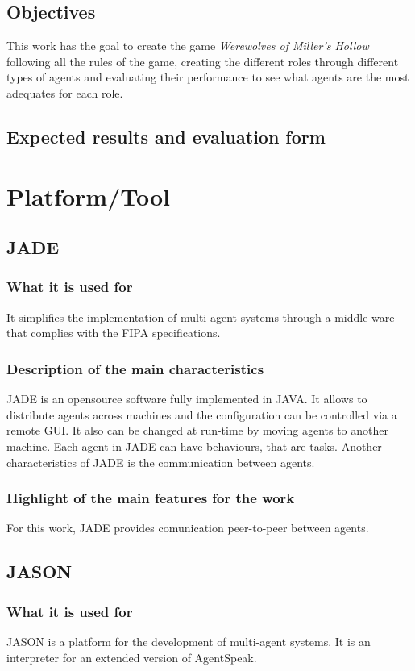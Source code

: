 \documentclass{article}
\begin{document}
\subsection{Objectives}
This work has the goal to create the game \textit{Werewolves of Miller’s Hollow} following all the rules of the game, creating the different roles through different types of agents and evaluating their performance to see what agents are the most adequates for each role. 
\subsection{Expected results and evaluation form}

\section{Platform/Tool}
\subsection{JADE}
\subsubsection{What it is used for}
It simplifies the implementation of multi-agent systems through a middle-ware that complies with the FIPA specifications.
\subsubsection{Description of the main characteristics}
JADE is an opensource software fully implemented in JAVA. It allows to distribute agents across machines and the configuration can be controlled via a remote GUI. It also can be changed at run-time by moving agents to another machine. Each agent in JADE can have behaviours, that are tasks.
Another characteristics of JADE is the communication between agents.
\subsubsection{Highlight of the main features for the work}
For this work, JADE provides comunication peer-to-peer between agents.
\subsection{JASON}
\subsubsection{What it is used for}
JASON is a platform for the development of multi-agent systems. It is an interpreter for an extended version of AgentSpeak.
\end{document}
